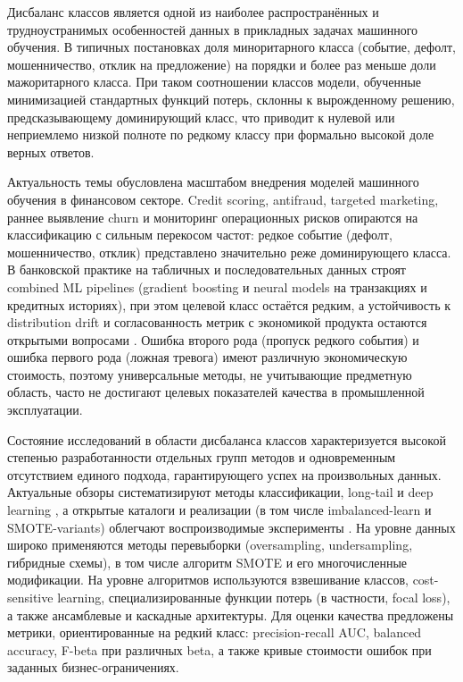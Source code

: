 \label{sec:intro}
Дисбаланс классов является одной из наиболее распространённых и трудноустранимых особенностей данных в прикладных задачах машинного обучения. В типичных постановках доля миноритарного класса (событие, дефолт, мошенничество, отклик на предложение) на порядки и более раз меньше доли мажоритарного класса. При таком соотношении классов модели, обученные минимизацией стандартных функций потерь, склонны к вырожденному решению, предсказывающему доминирующий класс, что приводит к нулевой или неприемлемо низкой полноте по редкому классу при формально высокой доле верных ответов.

Актуальность темы обусловлена масштабом внедрения моделей машинного обучения в финансовом секторе. Credit scoring, antifraud, targeted marketing, раннее выявление churn и мониторинг операционных рисков опираются на классификацию с сильным перекосом частот: редкое событие (дефолт, мошенничество, отклик) представлено значительно реже доминирующего класса. В банковской практике на табличных и последовательных данных строят combined ML pipelines (gradient boosting и neural models на транзакциях и кредитных историях), при этом целевой класс остаётся редким, а устойчивость к distribution drift и согласованность метрик с экономикой продукта остаются открытыми вопросами \cite{smirnov2021habrcard,smirnov2022habrbki,meacca2022habraccount,nickimpark2023habrunified}. Ошибка второго рода (пропуск редкого события) и ошибка первого рода (ложная тревога) имеют различную экономическую стоимость, поэтому универсальные методы, не учитывающие предметную область, часто не достигают целевых показателей качества в промышленной эксплуатации.

Состояние исследований в области дисбаланса классов характеризуется высокой степенью разработанности отдельных групп методов и одновременным отсутствием единого подхода, гарантирующего успех на произвольных данных. Актуальные обзоры систематизируют методы классификации, long-tail и deep learning \cite{chen2024surveyimbalanced,zhang2025systematiclongtail,dealvis2024deeplongtail,wallace2023nlpimbalance}, а открытые каталоги и реализации (в том числе imbalanced-learn и SMOTE-variants) облегчают воспроизводимые эксперименты \cite{lemaitre2017imbalanced,liu2023awesomeimbalanced,analyticalmindsltdSmoteVariants}. На уровне данных широко применяются методы перевыборки (oversampling, undersampling, гибридные схемы), в том числе алгоритм SMOTE и его многочисленные модификации. На уровне алгоритмов используются взвешивание классов, cost-sensitive learning, специализированные функции потерь (в частности, focal loss), а также ансамблевые и каскадные архитектуры. Для оценки качества предложены метрики, ориентированные на редкий класс: precision-recall AUC, balanced accuracy, F-beta при различных beta, а также кривые стоимости ошибок при заданных бизнес-ограничениях.

